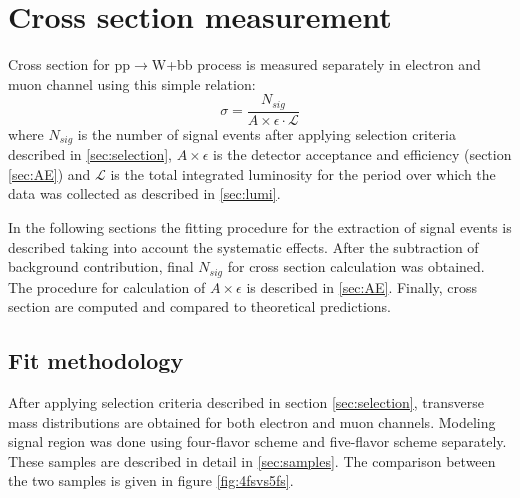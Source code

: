 
\chapter{Cross section measurement} %

\label{Chapter7} %



Cross section for pp$\rightarrow$W+bb process is measured separately in electron and muon channel using this simple relation:
\begin{equation}
\sigma = \frac{N_{sig}}{A\times \epsilon \cdot \mathcal{L}}
\end{equation}
where $N_{sig}$ is the number of signal events after applying selection criteria described in \ref{sec:selection}, $A\times \epsilon$ is the detector acceptance and efficiency (section \ref{sec:AE}) and $\mathcal{L}$ is the total integrated luminosity for the period over which the data was collected as described in \ref{sec:lumi}. 
\par In the following sections the fitting procedure for the extraction of signal events is described taking into account the systematic effects. After the subtraction of background contribution, final $N_{sig}$ for cross section calculation was obtained. The procedure for calculation of $A\times \epsilon$ is described in \ref{sec:AE}. Finally, cross section are computed and compared to theoretical predictions. 


\section{Fit methodology}

After applying selection criteria described in section \ref{sec:selection}, transverse mass distributions are obtained for both electron and muon channels. Modeling signal region was done using four-flavor scheme and five-flavor scheme separately. These samples are described in detail in \ref{sec:samples}. The comparison between the two samples is given in figure \ref{fig:4fsvs5fs}.

